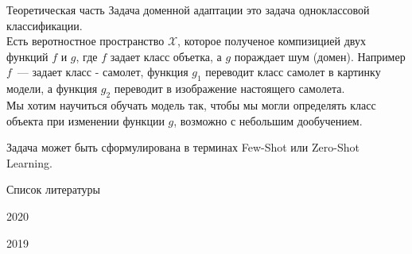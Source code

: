 \documentclass[9pt,pdf,hyperref={unicode}]{beamer}
\begin{document}
\begin{frame}{Теоретическая часть}
	    Задача доменной адаптации это задача одноклассовой классификации. \\
        Есть веротностное пространство $\mathcal{X}$, которое полученое компизицией двух функций $f$ и $g$, где $f$ задает класс объетка, а $g$ пораждает шум (домен). Например $f$~--- задает класс -  самолет, функция $g_1$ переводит класс самолет в картинку модели, а функция $g_2$ переводит в изображение настоящего самолета. \\
        Мы хотим научиться обучать модель так, чтобы мы могли определять класс объекта при изменении функции $g$, возможно с небольшим дообучением. 

    \begin{figure}[h]
        \begin{minipage}[h]{0.89\linewidth}
        \end{minipage}
    \label{heat_maps}
    \end{figure}

    Задача может быть сформулирована в терминах Few-Shot или Zero-Shot Learning.      
\end{frame}
	\begin{frame}{Список литературы}
		\begin{thebibliography}{1}
			

			 2020
			
			 2019
			
		\end{thebibliography}
		
	\end{frame}
\end{document}
